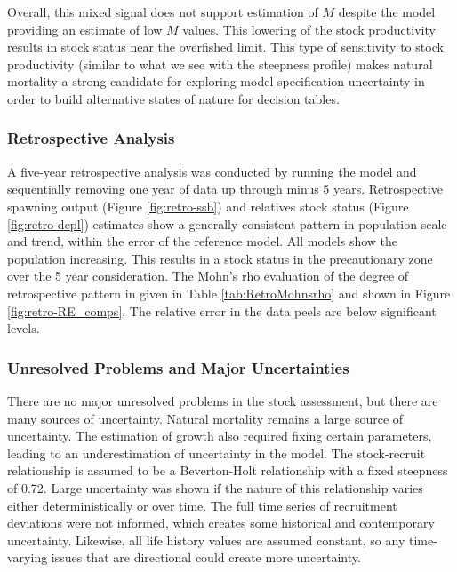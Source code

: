 \documentclass[11pt,
  english,
  letterpaper,
]{article}
\begin{document}
Overall, this mixed signal does not support estimation of \(M\) despite the model providing an estimate of low \(M\) values. This lowering of the stock productivity results in stock status near the overfished limit. This type of sensitivity to stock productivity (similar to what we see with the steepness profile) makes natural mortality a strong candidate for exploring model specification uncertainty in order to build alternative states of nature for decision tables.

\hypertarget{retrospective-analysis}{%
\subsubsection{Retrospective Analysis}\label{retrospective-analysis}}

A five-year retrospective analysis was conducted by running the model and sequentially removing one year of data up through minus 5 years. Retrospective spawning output (Figure \ref{fig:retro-ssb}) and relatives stock status (Figure \ref{fig:retro-depl}) estimates show a generally consistent pattern in population scale and trend, within the error of the reference model. All models show the population increasing. This results in a stock status in the precautionary zone over the 5 year consideration. The Mohn's rho evaluation of the degree of retrospective pattern in given in Table \ref{tab:RetroMohnsrho} and shown in Figure \ref{fig:retro-RE_comps}. The relative error in the data peels are below significant levels.

\hypertarget{unresolved-problems-and-major-uncertainties-1}{%
\subsubsection{Unresolved Problems and Major Uncertainties}\label{unresolved-problems-and-major-uncertainties-1}}

There are no major unresolved problems in the stock assessment, but there are many sources of uncertainty. Natural mortality remains a large source of uncertainty. The estimation of growth also required fixing certain parameters, leading to an underestimation of uncertainty in the model. The stock-recruit relationship is assumed to be a Beverton-Holt relationship with a fixed steepness of 0.72. Large uncertainty was shown if the nature of this relationship varies either deterministically or over time. The full time series of recruitment deviations were not informed, which creates some historical and contemporary uncertainty. Likewise, all life history values are assumed constant, so any time-varying issues that are directional could create more uncertainty.
\end{document}
